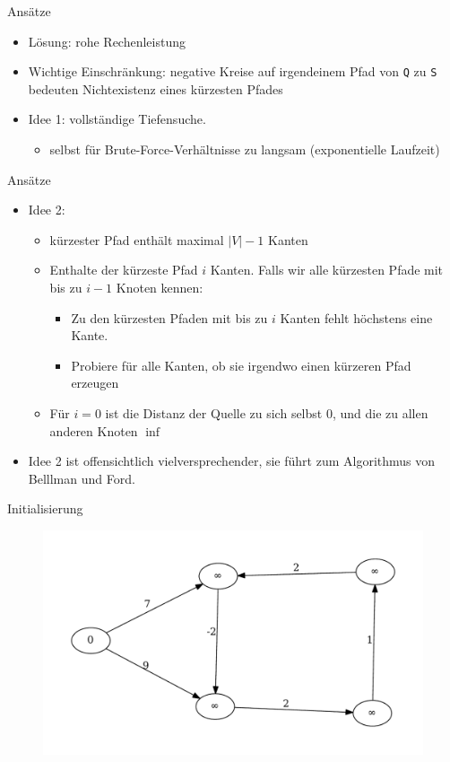 \begin{frame}{Ansätze}
\begin{itemize}
\item
  Lösung: rohe %
  Rechenleistung
\item
  Wichtige Einschränkung: negative Kreise auf irgendeinem Pfad von
  \texttt{Q} zu \texttt{S} bedeuten Nichtexistenz eines kürzesten Pfades
\item
  Idee 1: vollständige Tiefensuche.

  \begin{itemize}
  \item
    selbst für Brute-Force-Verhältnisse zu langsam (exponentielle
    Laufzeit)
  \end{itemize}
\end{itemize}
\end{frame}
\begin{frame}{Ansätze}
\begin{itemize}
\item
  Idee 2:
  \begin{itemize}
  \item
    kürzester Pfad enthält maximal $|V| - 1$ Kanten
  \item
    Enthalte der kürzeste Pfad $i$ Kanten. Falls wir alle kürzesten
    Pfade mit bis zu $i - 1$ Knoten kennen:

    \begin{itemize}
    \item
      Zu den kürzesten Pfaden mit bis zu $i$ Kanten fehlt höchstens eine
      Kante.
    \item
      Probiere für alle Kanten, ob sie irgendwo einen kürzeren Pfad
      erzeugen
    \end{itemize}
  \item
    Für $i = 0$ ist die Distanz der Quelle zu sich selbst 0, und die zu
    allen anderen Knoten $\inf$
  \end{itemize}
\item
  Idee 2 ist offensichtlich vielversprechender, sie führt zum
  Algorithmus von Belllman und Ford.
\end{itemize}
\end{frame}

\begin{frame}{Initialisierung}
\begin{figure}[htbp]
\centering
\includegraphics[width=\linewidth]{bellman_ford_graphs/graph_00.pdf}
\end{figure}
\end{frame}

